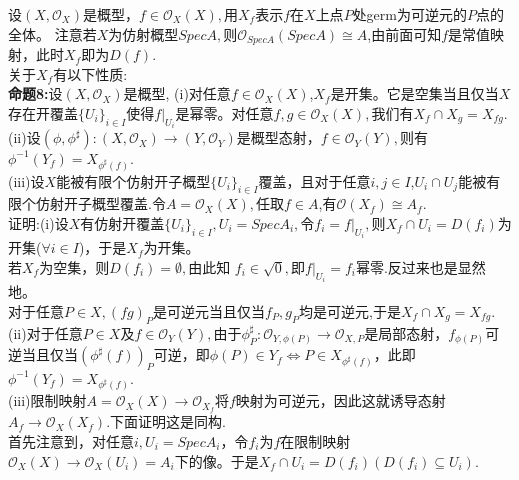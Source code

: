 \documentclass[UTF8]{article}
\begin{document}
设$(X,\mathcal{O}_{X})$是概型，$f\in \mathcal{O}_{X}(X),$用$X_{f}$表示$f$在$X$上点$P$处germ为可逆元的$P$点的全体。
注意若$X$为仿射概型$SpecA,$则$\mathcal{O}_{SpecA}(SpecA)\cong A$,由前面可知$f$是常值映射，此时$X_{f}$即为$D(f).$\\
关于$X_{f}$有以下性质:\\
\textbf{命题8:}设$(X,\mathcal{O}_{X})$是概型,
(i)对任意$f\in \mathcal{O}_{X}(X)$,$X_{f}$是开集。它是空集当且仅当$X$存在开覆盖$\{U_{i}\}_{i\in I}$使得$f|_{U_{i}}$是幂零。对任意$f,g\in \mathcal{O}_{X}(X),$我们有$X_{f}\cap X_{g}=X_{fg}.$\\
(ii)设$(\phi ,\phi^{\sharp}):(X,\mathcal{O}_{X})\rightarrow (Y,\mathcal{O}_{Y})$是概型态射，$f\in \mathcal{O}_{Y}(Y),$则有
$\phi^{-1}(Y_{f})=X_{\phi^{\sharp}(f)}.$\\
(iii)设$X$能被有限个仿射开子概型$\{U_{i}\}_{i\in I}$覆盖，且对于任意$i,j\in I$,$U_{i}\cap U_{j}$能被有限个仿射开子概型覆盖.令$A=\mathcal{O}_{X}(X),$任取$f\in A$,有$\mathcal{O}(X_{f})\cong A_{f}.$\\
证明:(i)设$X$有仿射开覆盖$\{U_{i}\}_{i\in I},U_{i}=SpecA_{i},$令$f_{i}=f|_{U_{i}},$则$X_{f}\cap U_{i}=D(f_{i})$为开集($\forall i\in I$)，于是$X_{f}$为开集。\\
若$X_{f}$为空集，则$D(f_{i})=\emptyset,$由此知
$f_{i}\in \sqrt{0},$即$f|_{U_{i}}=f_{i}$幂零.反过来也是显然地。\\
对于任意$P\in X,(fg)_{P}$是可逆元当且仅当$f_{P},g_{P}$均是可逆元,于是$X_{f}\cap X_{g}=X_{fg}.$\\
(ii)对于任意$P\in X$及$f\in \mathcal{O}_{Y}(Y),$由于$\phi_{P}^{\sharp}:\mathcal{O}_{Y,\phi(P)}\rightarrow \mathcal{O}_{X,P}$是局部态射，$f_{\phi(P)}$可逆当且仅当$(\phi^{\sharp}(f))_{P}$可逆，即$\phi(P)\in Y_{f}\Leftrightarrow P\in X_{\phi^{\sharp}(f)}$，此即$\phi^{-1}(Y_{f})=X_{\phi^{\sharp}(f)}.$\\
(iii)限制映射$A=\mathcal{O}_{X}(X)\rightarrow \mathcal{O}_{X_{f}}$将$f$映射为可逆元，因此这就诱导态射$A_{f}\rightarrow \mathcal{O}_{X}(X_{f})$.下面证明这是同构.\\
首先注意到，对任意$i,U_{i}=SpecA_{i}$，令$f_{i}$为$f$在限制映射$\mathcal{O}_{X}(X)\rightarrow \mathcal{O}_{X}(U_{i})=A_{i}$下的像。于是$X_{f}\cap U_{i}=D(f_{i})(D(f_{i})\subseteq U_{i}).$\\
\end{document}
